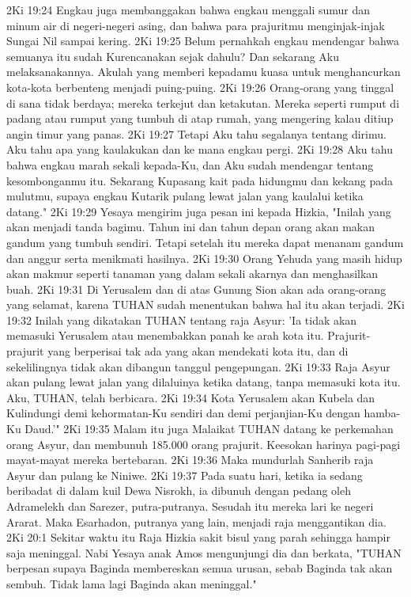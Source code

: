 2Ki 19:24  Engkau juga membanggakan bahwa engkau menggali sumur dan minum air di negeri-negeri asing, dan bahwa para prajuritmu menginjak-injak Sungai Nil sampai kering.
2Ki 19:25  Belum pernahkah engkau mendengar bahwa semuanya itu sudah Kurencanakan sejak dahulu? Dan sekarang Aku melaksanakannya. Akulah yang memberi kepadamu kuasa untuk menghancurkan kota-kota berbenteng menjadi puing-puing.
2Ki 19:26  Orang-orang yang tinggal di sana tidak berdaya; mereka terkejut dan ketakutan. Mereka seperti rumput di padang atau rumput yang tumbuh di atap rumah, yang mengering kalau ditiup angin timur yang panas.
2Ki 19:27  Tetapi Aku tahu segalanya tentang dirimu. Aku tahu apa yang kaulakukan dan ke mana engkau pergi.
2Ki 19:28  Aku tahu bahwa engkau marah sekali kepada-Ku, dan Aku sudah mendengar tentang kesombonganmu itu. Sekarang Kupasang kait pada hidungmu dan kekang pada mulutmu, supaya engkau Kutarik pulang lewat jalan yang kaulalui ketika datang."
2Ki 19:29  Yesaya mengirim juga pesan ini kepada Hizkia, "Inilah yang akan menjadi tanda bagimu. Tahun ini dan tahun depan orang akan makan gandum yang tumbuh sendiri. Tetapi setelah itu mereka dapat menanam gandum dan anggur serta menikmati hasilnya.
2Ki 19:30  Orang Yehuda yang masih hidup akan makmur seperti tanaman yang dalam sekali akarnya dan menghasilkan buah.
2Ki 19:31  Di Yerusalem dan di atas Gunung Sion akan ada orang-orang yang selamat, karena TUHAN sudah menentukan bahwa hal itu akan terjadi.
2Ki 19:32  Inilah yang dikatakan TUHAN tentang raja Asyur: 'Ia tidak akan memasuki Yerusalem atau menembakkan panah ke arah kota itu. Prajurit-prajurit yang berperisai tak ada yang akan mendekati kota itu, dan di sekelilingnya tidak akan dibangun tanggul pengepungan.
2Ki 19:33  Raja Asyur akan pulang lewat jalan yang dilaluinya ketika datang, tanpa memasuki kota itu. Aku, TUHAN, telah berbicara.
2Ki 19:34  Kota Yerusalem akan Kubela dan Kulindungi demi kehormatan-Ku sendiri dan demi perjanjian-Ku dengan hamba-Ku Daud.'"
2Ki 19:35  Malam itu juga Malaikat TUHAN datang ke perkemahan orang Asyur, dan membunuh 185.000 orang prajurit. Keesokan harinya pagi-pagi mayat-mayat mereka bertebaran.
2Ki 19:36  Maka mundurlah Sanherib raja Asyur dan pulang ke Niniwe.
2Ki 19:37  Pada suatu hari, ketika ia sedang beribadat di dalam kuil Dewa Nisrokh, ia dibunuh dengan pedang oleh Adramelekh dan Sarezer, putra-putranya. Sesudah itu mereka lari ke negeri Ararat. Maka Esarhadon, putranya yang lain, menjadi raja menggantikan dia.
2Ki 20:1  Sekitar waktu itu Raja Hizkia sakit bisul yang parah sehingga hampir saja meninggal. Nabi Yesaya anak Amos mengunjungi dia dan berkata, "TUHAN berpesan supaya Baginda membereskan semua urusan, sebab Baginda tak akan sembuh. Tidak lama lagi Baginda akan meninggal."
